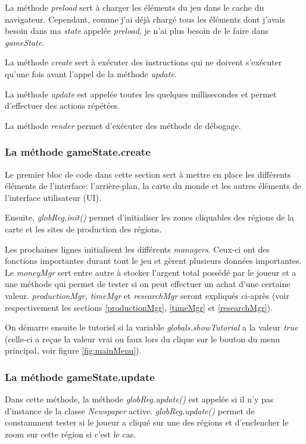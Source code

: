 \documentclass{article}
\begin{document}
		
		La méthode \textit{preload} sert à charger les éléments du jeu dans le cache du navigateur. Cependant, comme j'ai déjà chargé tous les éléments dont j'avais besoin dans ma \textit{state} appelée \textit{preload}, je n'ai plus besoin de le faire dans \textit{gameState}.  
		
		
		La méthode \textit{create} sert à exécuter des instructions qui ne doivent s'exécuter qu'une fois avant l'appel de la méthode \textit{update}.
		
		
		La méthode \textit{update} est appelée toutes les quelques millisecondes et permet d'effectuer des actions répétées.
		
		
		La méthode \textit{render} permet d'exécuter des méthode de débogage.
		
		\subsubsection{La méthode gameState.create}
		Le premier bloc de code dans cette section sert à mettre en place les différents éléments de l'interface: l'arrière-plan, la carte du monde et les autres éléments de l'interface utilisateur (UI).
		
		
		Ensuite, \textit{globReg.init()} permet d'initialiser les zones cliquables des régions de la carte et les sites de production des régions.
		
		
		Les prochaines lignes initialisent les différents \textit{managers}. Ceux-ci ont des fonctions importantes durant tout le jeu et gèrent plusieurs données importantes. Le \textit{moneyMgr} sert entre autre à stocker l'argent total possédé par le joueur et a une méthode qui permet de tester si on peut effectuer un achat d'une certaine valeur. \textit{productionMgr, timeMgr} et \textit{researchMgr} seront expliqués ci-après (voir respectivement les sections \ref{productionMgr}, \ref{timeMgr} et \ref{researchMgr}).
		
		
		On démarre ensuite le tutoriel si la variable \textit{globals.showTutorial} a la valeur \textit{true} (celle-ci a reçue la valeur vrai ou faux lors du clique sur le bouton du menu principal, voir figure \ref{fig:mainMenu}).
		
		\subsubsection{La méthode gameState.update}
		Dans cette méthode, la méthode \textit{globReg.update()} est appelée si il n'y pas d'instance de la classe \textit{Newspaper} active. \textit{globReg.update()} permet de constamment tester si le joueur a cliqué sur une des régions et d'enclencher le zoom sur cette région si c'est le cas.
		
\end{document}
